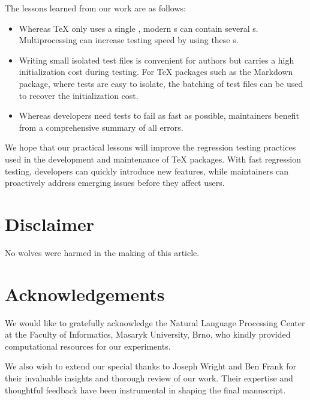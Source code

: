 \documentclass[final]{ltugboat}
\begin{document}
The lessons learned from our work are as follows:

\begin{itemize}
\item Whereas \TeX{} only uses a single , modern s can contain several s. Multiprocessing can increase testing speed by using these s.
\item Writing small isolated test files is convenient for authors but carries a high initialization cost during testing. For \TeX{} packages such as the Markdown package, where tests are easy to isolate, the batching of test files can be used to recover the initialization cost.
\item Whereas developers need tests to fail as fast as possible, maintainers benefit from a comprehensive summary of all errors.
\end{itemize}

We hope that our practical lessons will improve the regression testing practices used in the development and maintenance of \TeX{} packages. With fast regression testing, developers can quickly introduce new features, while maintainers can proactively address emerging issues before they affect users.

\medskip
\noindent


\section*{Disclaimer}
No wolves were harmed in the making of this article.

\section*{Acknowledgements}
We would like to gratefully acknowledge the Natural Language Processing Center at the Faculty of Informatics, Masaryk University, Brno, who kindly provided computational resources for our experiments.

We also wish to extend our special thanks to Joseph Wright and Ben Frank for their invaluable insights and thorough review of our work. Their expertise and thoughtful feedback have been instrumental in shaping the final manuscript.


\begingroup
\gappto{\UrlBreaks}{\UrlOrds}
\RaggedRight

\endgroup

\makesignature
\end{document}

